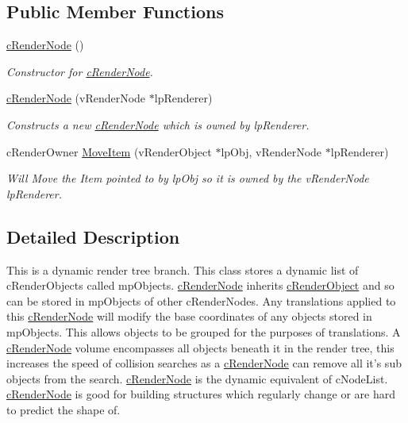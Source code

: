 \subsection*{Public Member Functions}
\begin{DoxyCompactItemize}
\item 
\hypertarget{classc_render_node_aeb068139475cb6af0aa41efc656e331d}{
\hyperlink{classc_render_node_aeb068139475cb6af0aa41efc656e331d}{cRenderNode} ()}
\label{classc_render_node_aeb068139475cb6af0aa41efc656e331d}

\begin{DoxyCompactList}\small\item\em Constructor for \hyperlink{classc_render_node}{cRenderNode}. \end{DoxyCompactList}\item 
\hypertarget{classc_render_node_a488098aa448aecae1524a56795f9512b}{
\hyperlink{classc_render_node_a488098aa448aecae1524a56795f9512b}{cRenderNode} (vRenderNode $\ast$lpRenderer)}
\label{classc_render_node_a488098aa448aecae1524a56795f9512b}

\begin{DoxyCompactList}\small\item\em Constructs a new \hyperlink{classc_render_node}{cRenderNode} which is owned by lpRenderer. \end{DoxyCompactList}\item 
\hypertarget{classc_render_node_a8babcc73316758de50745139f2a56923}{
cRenderOwner \hyperlink{classc_render_node_a8babcc73316758de50745139f2a56923}{MoveItem} (vRenderObject $\ast$lpObj, vRenderNode $\ast$lpRenderer)}
\label{classc_render_node_a8babcc73316758de50745139f2a56923}

\begin{DoxyCompactList}\small\item\em Will Move the Item pointed to by lpObj so it is owned by the vRenderNode lpRenderer. \end{DoxyCompactList}\end{DoxyCompactItemize}


\subsection{Detailed Description}
This is a dynamic render tree branch. This class stores a dynamic list of cRenderObjects called mpObjects. \hyperlink{classc_render_node}{cRenderNode} inherits \hyperlink{classc_render_object}{cRenderObject} and so can be stored in mpObjects of other cRenderNodes. Any translations applied to this \hyperlink{classc_render_node}{cRenderNode} will modify the base coordinates of any objects stored in mpObjects. This allows objects to be grouped for the purposes of translations. A \hyperlink{classc_render_node}{cRenderNode} volume encompasses all objects beneath it in the render tree, this increases the speed of collision searches as a \hyperlink{classc_render_node}{cRenderNode} can remove all it's sub objects from the search. \hyperlink{classc_render_node}{cRenderNode} is the dynamic equivalent of cNodeList. \hyperlink{classc_render_node}{cRenderNode} is good for building structures which regularly change or are hard to predict the shape of. 